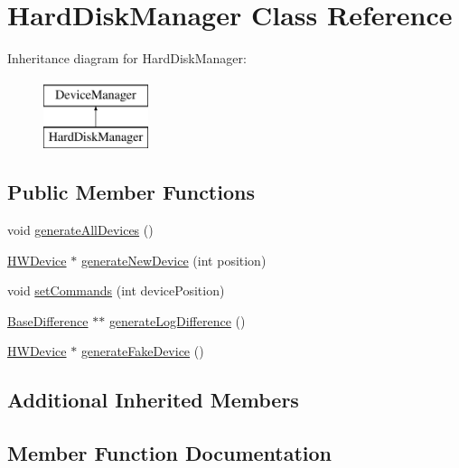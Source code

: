 \hypertarget{classHardDiskManager}{}\section{Hard\+Disk\+Manager Class Reference}
\label{classHardDiskManager}
Inheritance diagram for Hard\+Disk\+Manager\+:\begin{figure}[H]
\begin{center}
\leavevmode
\includegraphics[height=2.000000cm]{classHardDiskManager}
\end{center}
\end{figure}
\subsection*{Public Member Functions}
\begin{DoxyCompactItemize}
\item 
void \hyperlink{classHardDiskManager_ac69f4cfc902fa23ff238f33ee9731c3c}{generate\+All\+Devices} ()
\item 
\hyperlink{classHWDevice}{H\+W\+Device} $\ast$ \hyperlink{classHardDiskManager_a3960650a3232567f3488fb10fb10fa7c}{generate\+New\+Device} (int position)
\item 
void \hyperlink{classHardDiskManager_a8e219e6e508dd2d8a6190c44bcf45782}{set\+Commands} (int device\+Position)
\item 
\hyperlink{classBaseDifference}{Base\+Difference} $\ast$$\ast$ \hyperlink{classHardDiskManager_ae8579afefc3c0619ef05c30b9fda3b82}{generate\+Log\+Difference} ()
\item 
\hyperlink{classHWDevice}{H\+W\+Device} $\ast$ \hyperlink{classHardDiskManager_a586e786b4512ec8dfb79edb743794b77}{generate\+Fake\+Device} ()
\end{DoxyCompactItemize}
\subsection*{Additional Inherited Members}


\subsection{Member Function Documentation}

